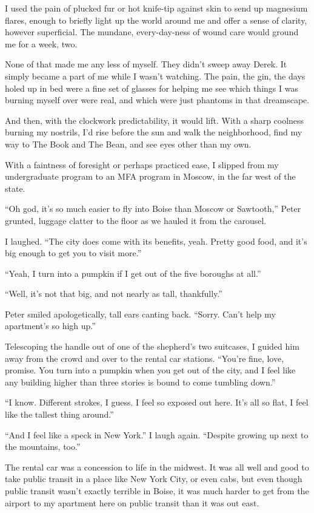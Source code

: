 I used the pain of plucked fur or hot knife-tip against skin to send up magnesium flares, enough to briefly light up the world around me and offer a sense of clarity, however superficial. The mundane, every-day-ness of wound care would ground me for a week, two.

None of that made me any less of myself. They didn't sweep away Derek. It simply became a part of me while I wasn't watching. The pain, the gin, the days holed up in bed were a fine set of glasses for helping me see which things I was burning myself over were real, and which were just phantoms in that dreamscape.

And then, with the clockwork predictability, it would lift. With a sharp coolness burning my nostrils, I'd rise before the sun and walk the neighborhood, find my way to The Book and The Bean, and see eyes other than my own.

With a faintness of foresight or perhaps practiced ease, I slipped from my undergraduate program to an MFA program in Moscow, in the far west of the state.

\secdiv{}

\noindent ``Oh god, it's so much easier to fly into Boise than Moscow or Sawtooth,'' Peter grunted, luggage clatter to the floor as we hauled it from the carousel.

I laughed. ``The city does come with its benefits, yeah. Pretty good food, and it's big enough to get you to visit more.''

``Yeah, I turn into a pumpkin if I get out of the five boroughs at all.''

``Well, it's not that big, and not nearly as tall, thankfully.''

Peter smiled apologetically, tall ears canting back. ``Sorry. Can't help my apartment's so high up.''

Telescoping the handle out of one of the shepherd's two suitcases, I guided him away from the crowd and over to the rental car stations. ``You're fine, love, promise. You turn into a pumpkin when you get out of the city, and I feel like any building higher than three stories is bound to come tumbling down.''

``I know. Different strokes, I guess. I feel so exposed out here. It's all so flat, I feel like the tallest thing around.''

``And I feel like a speck in New York.'' I laugh again. ``Despite growing up next to the mountains, too.''

The rental car was a concession to life in the midwest. It was all well and good to take public transit in a place like New York City, or even cabs, but even though public transit wasn't exactly terrible in Boise, it was much harder to get from the airport to my apartment here on public transit than it was out east.

